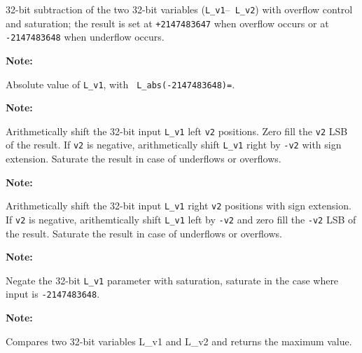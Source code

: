 32-bit subtraction of the two 32-bit variables ({\tt L\_v1}--{\tt
L\_v2}) with overflow control and saturation; the result is set at
{\tt +2147483647} when overflow occurs or at {\tt -2147483648}
when underflow occurs.

\textbf{Note:} \hfill {}


Absolute value of {\tt L\_v1}, with {\tt
L\_abs(-2147483648)=}.

\textbf{Note:} \hfill {}


Arithmetically shift the 32-bit input {\tt L\_v1} left {\tt v2}
positions. Zero fill the {\tt v2} LSB of the result. If {\tt v2}
is negative, arithmetically shift {\tt L\_v1} right by {\tt -v2}
with sign extension. Saturate the result in case of underflows or
overflows.

\textbf{Note:} \hfill {}


Arithmetically shift the 32-bit input {\tt L\_v1} right {\tt v2}
positions with sign extension. If {\tt v2} is negative,
arithemtically shift {\tt L\_v1} left by {\tt -v2} and zero fill
the {\tt -v2} LSB of the result. Saturate the result in case of
underflows or overflows.

\textbf{Note:} \hfill {}


Negate the 32-bit {\tt L\_v1} parameter with saturation, saturate in the
case where input is {\tt -2147483648}.

\textbf{Note:} \hfill {}

 

Compares two 32-bit variables L\_v1 and L\_v2 and returns the
maximum value. 

